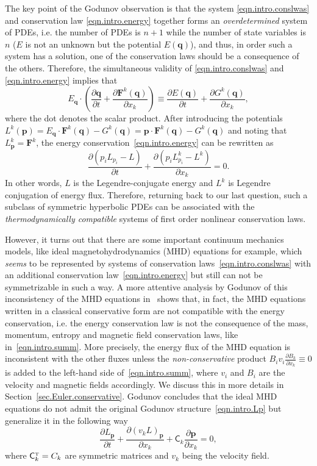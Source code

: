 \documentclass[twoside]{article}
\newcommand{\qq}{{\boldsymbol{q}}}
\newcommand{\pp}{{\boldsymbol{p}}}
\newcommand{\FF}{{\boldsymbol{F}}}
\newcommand{\pd}{\partial}
\newcommand{\transpose}{{\rm {\mathsmaller T}}}
\begin{document}
The key point of the Godunov observation is that the system 
\eqref{eqn.intro.conslwas} and conservation law \eqref{eqn.intro.energy} 
together forms an \textit{overdetermined} 
system of PDEs, i.e. the number of PDEs is $ n+1 $ while the number of state 
variables is $ n $ ($ E $ is not an unknown but the potential $ E(\qq) $), and 
thus, in order such a system has a solution, one of the 
conservation laws should be a consequence of the others. Therefore, the 
simultaneous 
validity of \eqref{eqn.intro.conslwas} and \eqref{eqn.intro.energy} implies 
that 
\begin{equation}\label{eqn.intro.summ}
E_\qq\cdot\left(\frac{\pd \qq}{\pd t} + \frac{\pd \FF^k(\qq)}{\pd x_k} \right) 
\equiv \frac{\pd E(\qq)}{\pd t} + \frac{\pd G^k(\qq)}{\pd x_k},
\end{equation}
where the dot denotes the scalar product.
After introducing the potentials $ L^k(\pp) = E_\qq\cdot\FF^k(\qq) - G^k(\qq) = 
\pp\cdot\FF^k(\qq) - G^k(\qq) $ and noting that $ L^k_\pp = \FF^k $, the energy 
conservation~\eqref{eqn.intro.energy} can be rewritten as
\begin{equation}
\frac{\pd (p_i L_{p_i}-L)}{\pd t} +\frac{\pd (p_iL^k_{p_i}-L^k)}{\pd x_k} = 0.
\end{equation}
In other words, $L$ is the Legendre-conjugate energy and $L^k$ is Legendre 
conjugation of energy flux.
Therefore, returning back to our last question, such a subclass of symmetric 
hyperbolic PDEs can be associated with the \textit{thermodynamically 
compatible} systems of first order nonlinear conservation laws.

However, it turns out that there are some important continuum mechanics models, 
like ideal magnetohydrodynamics (MHD) equations for example, which {\textit{ 
seems}} to be represented by systems of conservation 
laws~\eqref{eqn.intro.conslwas} with an additional conservation 
law~\eqref{eqn.intro.energy} but still can not be symmetrizable in such a way. 
A more attentive analysis by Godunov of this inconsistency of the MHD equations 
in~\cite{God1972} shows that, in fact, the MHD equations written in a classical 
conservative form are not compatible with the energy conservation, i.e. the 
energy conservation law is not the consequence of the mass, momentum, entropy 
and magnetic field conservation laws, like in~\eqref{eqn.intro.summ}. More 
precisely, the energy flux of the MHD equation is inconsistent with the other 
fluxes unless the \textit{non-conservative} product $ B_i v_i \frac{\pd 
B_k}{\pd x_k} \equiv 0$ 
is added to the left-hand side of~\eqref{eqn.intro.summ}, where $ v_i $ and $ 
B_i $ are the velocity and magnetic fields accordingly. We discuss this in more 
details in Section~\ref{sec.Euler.conservative}. Godunov concludes that the 
ideal MHD equations do not admit the original Godunov 
structure~\eqref{eqn.intro.Lp} but generalize it in the following way
\begin{equation}\label{eqn.intro.mhd}
\frac{\pd L_{\pp}}{\pd t} + \frac{\pd (v_k L)_{\pp}}{\pd x_k} + \mathsf{C}_k 
\frac{\pd \pp}{\pd x_k} = 0,
\end{equation}
where $ \mathsf{C}_k^\transpose = C_k $ are symmetric matrices and $ v_k $ 
being the velocity field.
\end{document}
